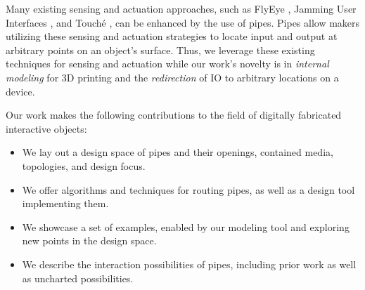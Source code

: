 Many existing sensing and actuation approaches, such as FlyEye \cite{Wimmer-flyeye}, Jamming User Interfaces \cite{Follmer-jamming}, and Touch\'{e} \cite{Sato-touche}, can be enhanced by the use of pipes.  Pipes allow makers utilizing these sensing and actuation strategies to locate input and output at arbitrary points on an object's surface.  Thus, we leverage these existing techniques for sensing and actuation while our work's novelty is in \emph{internal modeling} for 3D printing and the \emph{redirection} of IO to arbitrary locations on a device.

Our work makes the following contributions to the field of digitally fabricated interactive objects:

\begin{itemize}
\item We lay out a design space of pipes and their openings, contained media, topologies, and design focus.
\item We offer algorithms and techniques for routing pipes, as well as a design tool implementing them.
\item We showcase a set of examples, enabled by our modeling tool and exploring new points in the design space.
\item We describe the interaction possibilities of pipes, including prior work as well as uncharted possibilities.
\end{itemize}